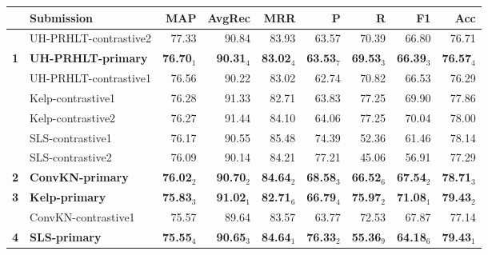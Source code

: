 \begin{table*}[tbh]
\begin{center}
\begin{tabular}{clrrrrrrr}
& \bf Submission & \bf MAP & \bf \scriptsize AvgRec & \bf \scriptsize MRR & \bf \scriptsize P & \bf \scriptsize R & \bf \scriptsize F1 & \bf \scriptsize Acc\\
\hline
& UH-PRHLT-contrastive2 & 77.33 & \scriptsize 90.84 & \scriptsize 83.93 & \scriptsize 63.57 & \scriptsize 70.39 & \scriptsize 66.80 & \scriptsize 76.71 \\
\bf 1 & \bf UH-PRHLT-primary & \bf 76.70$_{1}$ & \bf \scriptsize 90.31$_{4}$ & \bf \scriptsize 83.02$_{4}$ & \bf \scriptsize 63.53$_{7}$ & \bf \scriptsize 69.53$_{3}$ & \bf \scriptsize 66.39$_{3}$ & \bf \scriptsize 76.57$_{4}$ \\
& UH-PRHLT-contrastive1 & 76.56 & \scriptsize 90.22 & \scriptsize 83.02 & \scriptsize 62.74 & \scriptsize 70.82 & \scriptsize 66.53 & \scriptsize 76.29 \\
& Kelp-contrastive1 & 76.28 & \scriptsize 91.33 & \scriptsize 82.71 & \scriptsize 63.83 & \scriptsize 77.25 & \scriptsize 69.90 & \scriptsize 77.86 \\
& Kelp-contrastive2 & 76.27 & \scriptsize 91.44 & \scriptsize 84.10 & \scriptsize 64.06 & \scriptsize 77.25 & \scriptsize 70.04 & \scriptsize 78.00 \\
& SLS-contrastive1 & 76.17 & \scriptsize 90.55 & \scriptsize 85.48 & \scriptsize 74.39 & \scriptsize 52.36 & \scriptsize 61.46 & \scriptsize 78.14 \\
& SLS-contrastive2 & 76.09 & \scriptsize 90.14 & \scriptsize 84.21 & \scriptsize 77.21 & \scriptsize 45.06 & \scriptsize 56.91 & \scriptsize 77.29 \\
\bf 2 & \bf ConvKN-primary & \bf 76.02$_{2}$ & \bf \scriptsize 90.70$_{2}$ & \bf \scriptsize 84.64$_{2}$ & \bf \scriptsize 68.58$_{3}$ & \bf \scriptsize 66.52$_{6}$ & \bf \scriptsize 67.54$_{2}$ & \bf \scriptsize 78.71$_{3}$ \\
\bf 3 & \bf Kelp-primary & \bf 75.83$_{3}$ & \bf \scriptsize 91.02$_{1}$ & \bf \scriptsize 82.71$_{6}$ & \bf \scriptsize 66.79$_{4}$ & \bf \scriptsize 75.97$_{2}$ & \bf \scriptsize 71.08$_{1}$ & \bf \scriptsize 79.43$_{2}$ \\
& ConvKN-contrastive1 & 75.57 & \scriptsize 89.64 & \scriptsize 83.57 & \scriptsize 63.77 & \scriptsize 72.53 & \scriptsize 67.87 & \scriptsize 77.14 \\
\bf 4 & \bf SLS-primary & \bf 75.55$_{4}$ & \bf \scriptsize 90.65$_{3}$ & \bf \scriptsize 84.64$_{1}$ & \bf \scriptsize 76.33$_{2}$ & \bf \scriptsize 55.36$_{9}$ & \bf \scriptsize 64.18$_{6}$ & \bf \scriptsize 79.43$_{1}$ \\

\end{tabular}
\end{center}
\end{table*}
